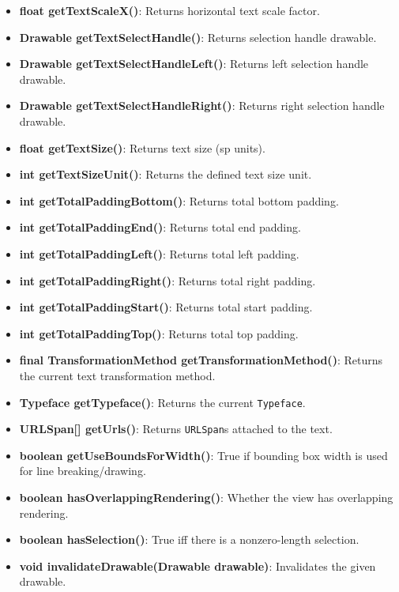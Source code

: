 \documentclass{report}
\begin{document}
\begin{itemize}
\begin{itemize}
                \item \textbf{float getTextScaleX()}: Returns horizontal text scale factor.
                \item \textbf{Drawable getTextSelectHandle()}: Returns selection handle drawable.
                \item \textbf{Drawable getTextSelectHandleLeft()}: Returns left selection handle drawable.
                \item \textbf{Drawable getTextSelectHandleRight()}: Returns right selection handle drawable.
                \item \textbf{float getTextSize()}: Returns text size (sp units).
                \item \textbf{int getTextSizeUnit()}: Returns the defined text size unit.
                \item \textbf{int getTotalPaddingBottom()}: Returns total bottom padding.
                \item \textbf{int getTotalPaddingEnd()}: Returns total end padding.
                \item \textbf{int getTotalPaddingLeft()}: Returns total left padding.
                \item \textbf{int getTotalPaddingRight()}: Returns total right padding.
                \item \textbf{int getTotalPaddingStart()}: Returns total start padding.
                \item \textbf{int getTotalPaddingTop()}: Returns total top padding.
                \item \textbf{final TransformationMethod getTransformationMethod()}: Returns the current text transformation method.
                \item \textbf{Typeface getTypeface()}: Returns the current \texttt{Typeface}.
                \item \textbf{URLSpan[] getUrls()}: Returns \texttt{URLSpan}s attached to the text.
                \item \textbf{boolean getUseBoundsForWidth()}: True if bounding box width is used for line breaking/drawing.
                \item \textbf{boolean hasOverlappingRendering()}: Whether the view has overlapping rendering.
                \item \textbf{boolean hasSelection()}: True iff there is a nonzero-length selection.
                \item \textbf{void invalidateDrawable(Drawable drawable)}: Invalidates the given drawable.

\end{itemize}
\end{itemize}
\end{document}
